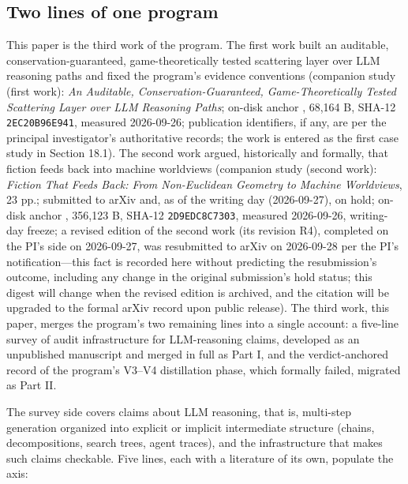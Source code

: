 \documentclass[11pt]{article}
\newcommand{\sha}[1]{\texttt{#1}}
\begin{document}
\subsection{Two lines of one program}
\noindent This paper is the third work of the program. The first work built an auditable, conservation-guaranteed, game-theoretically tested scattering layer over LLM reasoning paths and fixed the program's evidence conventions (companion study (first work): \emph{An Auditable, Conservation-Guaranteed, Game-Theoretically Tested Scattering Layer over LLM Reasoning Paths}; on-disk anchor , 68,164 B, SHA-12 \sha{2EC20B96E941}, measured 2026-09-26; publication identifiers, if any, are per the principal investigator's authoritative records; the work is entered as the first case study in Section 18.1). The second work argued, historically and formally, that fiction feeds back into machine worldviews (companion study (second work): \emph{Fiction That Feeds Back: From Non-Euclidean Geometry to Machine Worldviews}, 23 pp.; submitted to arXiv and, as of the writing day (2026-09-27), on hold; on-disk anchor , 356,123 B, SHA-12 \sha{2D9EDC8C7303}, measured 2026-09-26, writing-day freeze; a revised edition of the second work (its revision R4), completed on the PI's side on 2026-09-27, was resubmitted to arXiv on 2026-09-28 per the PI's notification—this fact is recorded here without predicting the resubmission's outcome, including any change in the original submission's hold status; this digest will change when the revised edition is archived, and the citation will be upgraded to the formal arXiv record upon public release). The third work, this paper, merges the program's two remaining lines into a single account: a five-line survey of audit infrastructure for LLM-reasoning claims, developed as an unpublished manuscript and merged in full as Part I, and the verdict-anchored record of the program's V3–V4 distillation phase, which formally failed, migrated as Part II.\par
\noindent The survey side covers claims about LLM reasoning, that is, multi-step generation organized into explicit or implicit intermediate structure (chains, decompositions, search trees, agent traces), and the infrastructure that makes such claims checkable. Five lines, each with a literature of its own, populate the axis:\par
\begingroup\small
\end{document}
